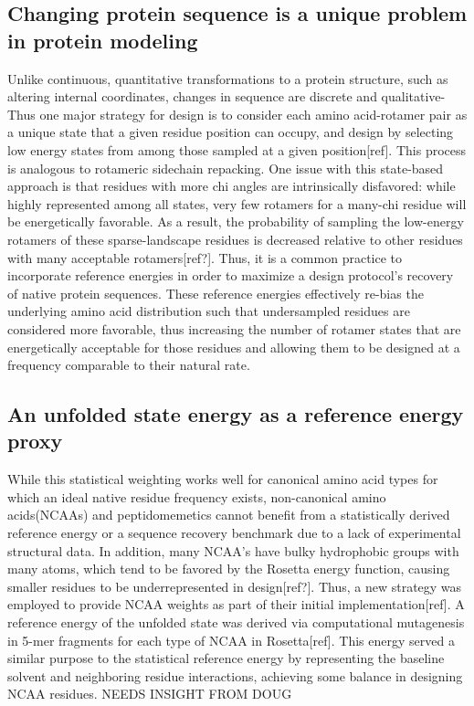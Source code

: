 \subsection{Changing protein sequence is a unique problem in protein modeling}
Unlike continuous, quantitative transformations to a protein structure, such as altering internal coordinates, changes in sequence are discrete and qualitative- Thus one major strategy for design is to consider each amino acid-rotamer pair as a unique state that a given residue position can occupy, and design by selecting low energy states from among those sampled at a given position[ref]. This process is analogous to rotameric sidechain repacking.
One issue with this state-based approach is that residues with more chi angles are intrinsically disfavored: while highly represented among all states, very few rotamers for a many-chi residue will be energetically favorable. As a result, the probability of sampling the low-energy rotamers of these sparse-landscape residues is decreased relative to other residues with many acceptable rotamers[ref?].
Thus, it is a common practice to incorporate reference energies in order to maximize a design protocol's recovery of native protein sequences. These reference energies effectively re-bias the underlying amino acid distribution such that undersampled residues are considered more favorable, thus increasing the number of rotamer states that are energetically acceptable for those residues and allowing them to be designed at a frequency comparable to their natural rate. 

\subsection{An unfolded state energy as a reference energy proxy}
While this statistical weighting works well for canonical amino acid types for which an ideal native residue frequency exists, non-canonical amino acids(NCAAs) and peptidomemetics cannot benefit from a statistically derived reference energy or a sequence recovery benchmark due to a lack of experimental structural data. In addition, many NCAA's have bulky hydrophobic groups with many atoms, which tend to be favored by the Rosetta energy function, causing smaller residues to be underrepresented in design[ref?].
Thus, a new strategy was employed to provide NCAA weights as part of their initial implementation[ref]. A reference energy of the unfolded state was derived via computational mutagenesis in 5-mer fragments for each type of NCAA in Rosetta[ref]. This energy served a similar purpose to the statistical reference energy by representing the baseline solvent and neighboring residue interactions, achieving some balance in designing NCAA residues. NEEDS INSIGHT FROM DOUG

